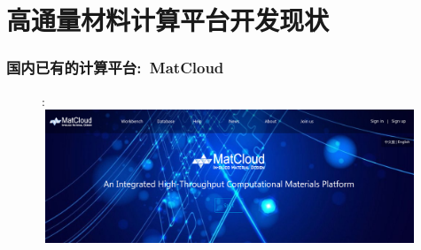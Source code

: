 \documentclass[cjk,slidestop,compress,mathserif,blue]{beamer}
\newcommand{\upcite}[1]{\hspace{0ex}\textsuperscript{\cite{#1}}} %
\begin{document}
\section{高通量材料计算平台开发现状}     %
\frame
{
	\frametitle{国内已有的计算平台:~\textrm{MatCloud}}
\begin{figure}[h!]:
\centering
\includegraphics[height=1.57in,width=4.95in,viewport=0 0 1800 550,clip]{Figures/Matcloud-login.png}
\caption{\fontsize{7.2pt}{4.2pt}\selectfont{中科院计算机网络信息中心~杨小渝团队开发}\upcite{CMS146-319_2018,url_Matcloud}}%
\label{Auto_Flow_Platform-2}
\end{figure}
}
\end{document}
